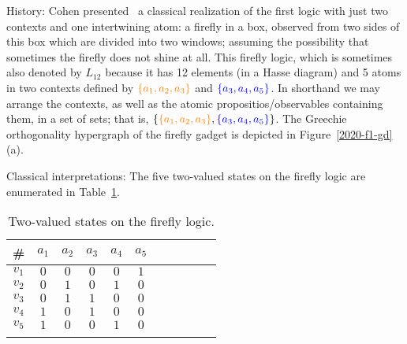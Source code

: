 History:
Cohen presented~\cite[pp.~21,~22]{cohen} a classical realization of the first logic with just two contexts and one intertwining atom: a firefly in a box,
observed from two sides of this box which are divided into two windows; assuming the possibility that sometimes the firefly does not shine at all.
This firefly logic, which is sometimes also denoted by $L_{12}$ because it has 12 elements (in a Hasse diagram) and 5 atoms in
two contexts defined by ${\color{orange}\{a_1,a_2,a_3\}}$ and ${\color{blue}\{a_3,a_4,a_5\}}$.
In shorthand we may arrange the contexts, as well as the atomic propositios/observables containing them, in a set of sets; that is,
$
\{
{\color{orange}\{a_1,a_2,a_3\}}
,\\
{\color{blue}\{a_3,a_4,a_5\}}
\}
$.
The Greechie orthogonality hypergraph of the firefly gadget is depicted in Figure~\ref{2020-f1-gd}(a).

Classical interpretations:
The five two-valued states on the firefly logic are enumerated in Table~\ref{2017-b-t-fireflytvs}.
 \begin{table}%
 \begin{center}
 \caption{\label{2017-b-t-fireflytvs}  Two-valued states on the firefly logic.}
 \begin{tabular}{ccccccccccc}
 \#     &$a_1$&$a_2$&$a_3$&$a_4$&$a_5$\\
\hline
$v_1$&$0$&$0$&$0$&$0$&$1$  \\
$v_2$&$0$&$1$&$0$&$1$&$0$  \\
$v_3$&$0$&$1$&$1$&$0$&$0$  \\
$v_4$&$1$&$0$&$1$&$0$&$0$  \\
$v_5$&$1$&$0$&$0$&$1$&$0$
\\ 
 \end{tabular}
 \end{center}
 \end{table}


